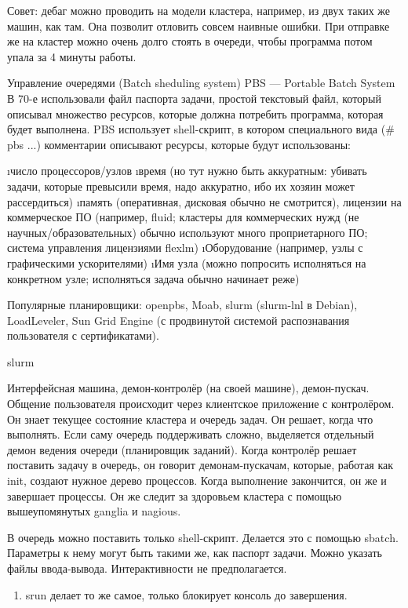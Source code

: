 Совет: дебаг можно проводить на модели кластера, например, из двух таких же машин, как там. Она позволит отловить совсем наивные ошибки. При отправке же на кластер можно очень долго стоять в очереди, чтобы программа потом упала за 4 минуты работы.

Управление очередями (Batch sheduling system)
 PBS --- Portable Batch System
 В 70-е использовали файл паспорта задачи, простой текстовый файл, который описывал множество ресурсов, которые должна потребить программа, которая будет выполнена. 
 PBS использует shell-скрипт, в котором специального вида (\# pbs ...) комментарии описывают ресурсы, которые будут использованы: 
 \begin{enumerate}
  \i число процессоров/узлов
  \i время (но тут нужно быть аккуратным: убивать задачи, которые превысили время, надо аккуратно, ибо их хозяин может рассердиться)
  \i память (оперативная, дисковая обычно не смотрится), лицензии на коммерческое ПО (например, fluid; кластеры для коммерческих нужд (не научных/образовательных) обычно используют много проприетарного ПО; система управления лицензиями flexlm)
 \i Оборудование (например, узлы с графическими ускорителями)
 \i Имя узла (можно попросить исполняться на конкретном узле; исполняться задача обычно начинает реже)
 \end{enumerate}
 Популярные планировщики: openpbs, Moab, slurm (slurm-lnl в Debian), LoadLeveler, Sun Grid Engine (с продвинутой системой распознавания пользователя с сертификатами).
 
 slurm
 
 Интерфейсная машина, демон-контролёр (на своей машине), демон-пускач. Общение пользователя происходит через клиентское приложение с контролёром. Он знает текущее состояние кластера и очередь задач. Он решает, когда что выполнять. Если саму очередь поддерживать сложно, выделяется отдельный демон ведения очереди (планировщик заданий). Когда контролёр решает поставить задачу в очередь, он говорит демонам-пускачам, которые, работая как init, создают нужное дерево процессов. Когда выполнение закончится, он же и завершает процессы. Он же следит за здоровьем кластера с помощью вышеупомянутых ganglia и nagious.
 
 В очередь можно поставить только shell-скрипт. Делается это с помощью sbatch. Параметры к нему могут быть такими же, как паспорт задачи. Можно указать файлы ввода-вывода. Интерактивности не предполагается.
 \begin{enumerate}
 	\item srun делает то же самое, только блокирует консоль до завершения.
 \end{enumerate}
 
